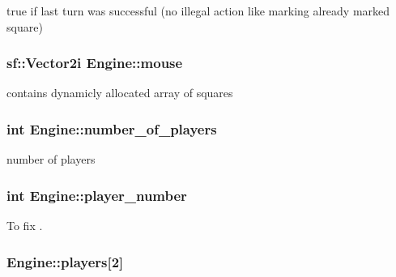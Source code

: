 true if last turn was successful (no illegal action like marking already marked square) 

\hypertarget{class_engine_a6da5d0a63da9f898192b2030b754065f}{}
\subsubsection[{mouse}]{\setlength{\rightskip}{0pt plus 5cm}sf\+::\+Vector2i Engine\+::mouse\hspace{0.3cm}{\ttfamily [private]}}\label{class_engine_a6da5d0a63da9f898192b2030b754065f}


contains dynamicly allocated array of squares 

\hypertarget{class_engine_a7c9d0480379dfdf9eafaf3344d076e4d}{}
\subsubsection[{number\+\_\+of\+\_\+players}]{\setlength{\rightskip}{0pt plus 5cm}int Engine\+::number\+\_\+of\+\_\+players\hspace{0.3cm}{\ttfamily [private]}}\label{class_engine_a7c9d0480379dfdf9eafaf3344d076e4d}


number of players 

\hypertarget{class_engine_a663054b19f734fa167305abf546d8151}{}
\subsubsection[{player\+\_\+number}]{\setlength{\rightskip}{0pt plus 5cm}int Engine\+::player\+\_\+number\hspace{0.3cm}{\ttfamily [private]}}\label{class_engine_a663054b19f734fa167305abf546d8151}


To fix . 

\hypertarget{class_engine_a2fd7bb89b1be2ea2a33e90e4d0699ffc}{}
\subsubsection[{players}]{ Engine\+::players\mbox{[}2\mbox{]}\hspace{0.3cm}{\ttfamily [private]}}\label{class_engine_a2fd7bb89b1be2ea2a33e90e4d0699ffc}


